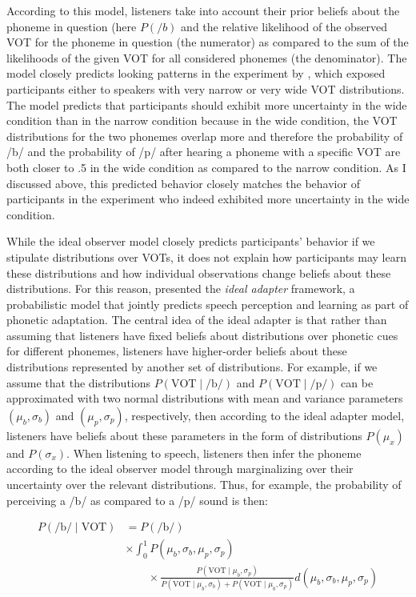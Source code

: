 \noindent According to this model, listeners take into account their prior beliefs about the phoneme in question (here $P(/b)$ and the relative likelihood of the observed VOT for the phoneme in question (the numerator) as compared to
the sum of the likelihoods of the given VOT for all considered phonemes (the denominator). The model closely predicts looking patterns in the experiment by 
\citeauthor{Clayards2008}, which exposed participants either to speakers with very narrow or very wide VOT distributions.
 The model predicts that participants should exhibit more uncertainty in the wide condition than in the narrow condition because in the wide condition, the VOT distributions for the two phonemes
 overlap more and therefore the probability of /b/ and the probability of /p/ after hearing a phoneme with a specific VOT are both closer to .5 in the wide condition as compared to the narrow condition. 
 As I discussed above, this predicted behavior closely matches the behavior of participants in the experiment who indeed exhibited more uncertainty in the wide condition.
 
 While the ideal observer model closely predicts participants' behavior if we stipulate distributions over VOTs, it does not explain how participants may learn these distributions and how individual observations
 change  beliefs about these distributions. For this reason, \textcite{Kleinschmidt2015} presented the \textit{ideal adapter} framework, a probabilistic model that jointly predicts speech perception and learning
 as part of phonetic adaptation. The central idea of the ideal adapter is that rather than assuming that listeners have fixed beliefs about distributions over phonetic cues for different phonemes, listeners have higher-order
 beliefs about these distributions represented by another set of distributions. For example, if we assume that the distributions $P(\mbox{VOT}\mid \mbox{/b/})$ and $P(\mbox{VOT}\mid \mbox{/p/})$ can be approximated
 with two normal distributions with mean and variance parameters $(\mu_{b}, \sigma_{b})$ and $(\mu_{p}, \sigma_{p})$, respectively, then according to the ideal adapter model, listeners have beliefs about these parameters
 in the form of distributions $P(\mu_x)$ and $P(\sigma_x)$. When listening to speech, listeners then infer the phoneme according to the ideal observer model through marginalizing over their uncertainty over the relevant distributions.
 Thus, for example, the probability of perceiving a /b/ as compared to a /p/ sound is then:
 
\begin{align*}
  P(\mbox{/b/} \mid \mbox{VOT}) &=  P(\mbox{/b/}) \\ &  \times \int_{0}^1 P(\mu_b, \sigma_b, \mu_p, \sigma_p) \\ 
  & \qquad  \times \frac{P(\mbox{VOT}\mid \mu_b, \sigma_p)}{P(\mbox{VOT}\mid \mu_b, \sigma_b) + P(\mbox{VOT}\mid \mu_b, \sigma_p)} d (\mu_b, \sigma_b, \mu_p, \sigma_p)
\end{align*}

